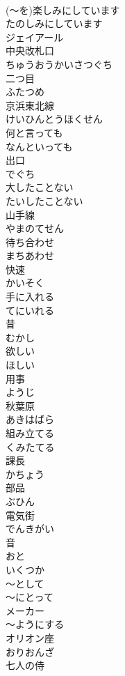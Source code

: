 \documentclass[8pt]{extreport}
\begin{document}
\begin{CJK}{UTF8}{min}
\\	(～を)楽しみにしています	
\\	たのしみにしています
\\	ジェイアール
\\	中央改札口	
\\	ちゅうおうかいさつぐち
\\	二つ目	
\\	ふたつめ
\\	京浜東北線	
\\	けいひんとうほくせん
\\	何と言っても	
\\	なんといっても
\\	出口	
\\	でぐち
\\	大したことない	
\\	たいしたことない
\\	山手線	
\\	やまのてせん
\\	待ち合わせ	
\\	まちあわせ
\\	快速	
\\	かいそく
\\	手に入れる	
\\	てにいれる
\\	昔	
\\	むかし
\\	欲しい	
\\	ほしい
\\	用事	
\\	ようじ
\\	秋葉原	
\\	あきはばら
\\	組み立てる	
\\	くみたてる
\\	課長	
\\	かちょう
\\	部品	
\\	ぶひん
\\	電気街	
\\	でんきがい
\\	音	
\\	おと
\\	いくつか	
\\	～として	
\\	～にとって	
\\	メーカー	
\\	～ようにする	
\\	オリオン座	
\\	おりおんざ
\\	七人の侍	

\end{CJK}
\end{document}
